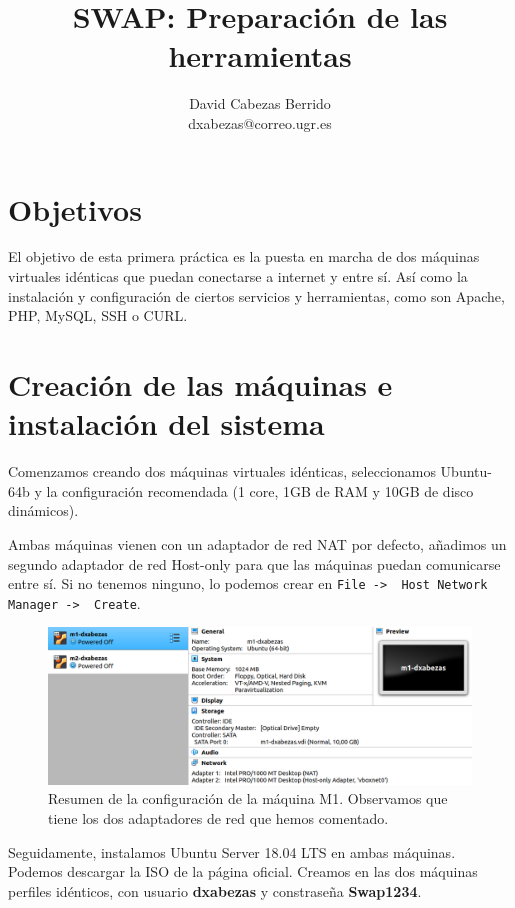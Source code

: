 \documentclass{article}
\title{\Huge SWAP: Preparación de las herramientas\vspace{10mm}}
\author{\huge David Cabezas Berrido \vspace{10mm} \\ 
  \huge dxabezas@correo.ugr.es \vspace{10mm}}
\begin{document}
\maketitle
\tableofcontents
\newpage

\section{Objetivos}

El objetivo de esta primera práctica es la puesta en marcha de dos máquinas virtuales idénticas que puedan conectarse a internet y entre sí.
Así como la instalación y configuración de ciertos servicios y herramientas, como son Apache, PHP, MySQL, SSH o CURL.

\section{Creación de las máquinas e instalación del sistema}

Comenzamos creando dos máquinas virtuales idénticas, seleccionamos Ubuntu-64b y la configuración recomendada (1 core, 1GB de RAM y 10GB de disco dinámicos).

Ambas máquinas vienen con un adaptador de red NAT por defecto, añadimos un segundo adaptador de red Host-only para que las máquinas puedan comunicarse entre sí. Si no tenemos ninguno, lo podemos crear en \texttt{File -> \ Host Network Manager -> \ Create}.

\begin{figure}[H]
	\centering
	\includegraphics[width=160mm]{imgs/maquinas}
	\caption{Resumen de la configuración de la máquina M1. Observamos que tiene los dos adaptadores de red que hemos comentado.}
	\label{fig:maquinas}
\end{figure}

Seguidamente, instalamos Ubuntu Server 18.04 LTS en ambas máquinas. Podemos descargar la ISO de la página oficial. Creamos en las dos máquinas perfiles idénticos, con usuario \textbf{dxabezas} y constraseña \textbf{Swap1234}.
\end{document}
